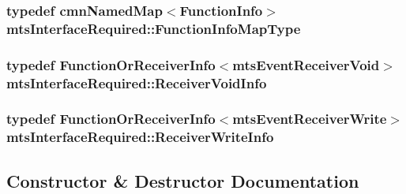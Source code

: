 \subsubsection[{Function\+Info\+Map\+Type}]{\setlength{\rightskip}{0pt plus 5cm}typedef {\bf cmn\+Named\+Map}$<${\bf Function\+Info}$>$ {\bf mts\+Interface\+Required\+::\+Function\+Info\+Map\+Type}\hspace{0.3cm}{\ttfamily [protected]}}\label{classmts_interface_required_a4c21eaf53811c5782bae6293904cffe5}
\hypertarget{classmts_interface_required_a7ddf0b5c0205b5a512562171275ff1c3}{}
\subsubsection[{Receiver\+Void\+Info}]{\setlength{\rightskip}{0pt plus 5cm}typedef {\bf Function\+Or\+Receiver\+Info}$<${\bf mts\+Event\+Receiver\+Void}$>$ {\bf mts\+Interface\+Required\+::\+Receiver\+Void\+Info}}\label{classmts_interface_required_a7ddf0b5c0205b5a512562171275ff1c3}
\hypertarget{classmts_interface_required_a66d230e43ed3c2bb07f0593a997f06cc}{}
\subsubsection[{Receiver\+Write\+Info}]{\setlength{\rightskip}{0pt plus 5cm}typedef {\bf Function\+Or\+Receiver\+Info}$<${\bf mts\+Event\+Receiver\+Write}$>$ {\bf mts\+Interface\+Required\+::\+Receiver\+Write\+Info}}\label{classmts_interface_required_a66d230e43ed3c2bb07f0593a997f06cc}


\subsection{Constructor \& Destructor Documentation}
\hypertarget{classmts_interface_required_a3394011d351fabdfa7f341f0e6ac36bb}{}

